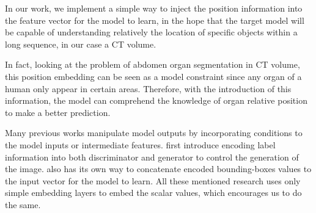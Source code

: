 In our work, we implement a simple way to inject the position information into the feature vector for the model to learn, in the hope that the target model will be capable of understanding relatively the location of specific objects within a long sequence, in our case a CT volume.

In fact, looking at the problem of abdomen organ segmentation in CT volume, this position embedding can be seen as a model constraint since any organ of a human only appear in certain areas. Therefore, with the introduction of this information, the model can comprehend the knowledge of organ relative position to make a better prediction. 

Many previous works manipulate model outputs by incorporating conditions to the model inputs or intermediate features. \cite{mirza2014cgan} first introduce encoding label information into both discriminator and generator to control the generation of the image. \cite{messina2021transformer} also has its own way to concatenate encoded bounding-boxes values to the input vector for the model to learn. All these mentioned research uses only simple embedding layers to embed the scalar values, which encourages us to do the same. 